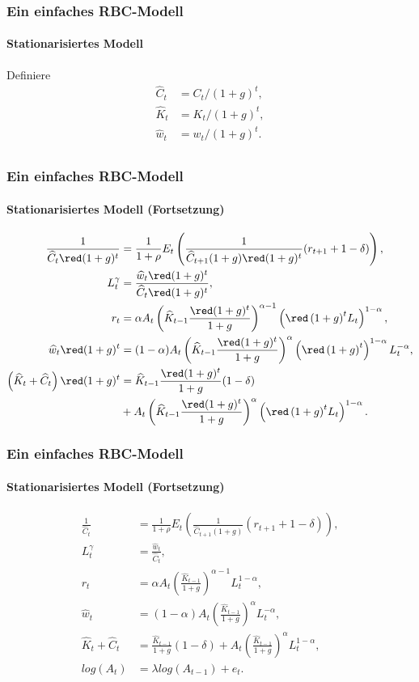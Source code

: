 \documentclass[10pt]{beamer}  %
\begin{document}
\begin{frame}\frametitle{Ein einfaches RBC-Modell}
  \framesubtitle{Stationarisiertes Modell}
  Definiere
  \begin{align*}
    \widehat{C}_t &= C_t/(1+g)^t,\\
    \widehat{K}_t &= K_t/(1+g)^t,\\
    \widehat{w}_t &= w_t/(1+g)^t.\\
  \end{align*}
\end{frame}

\begin{frame}\frametitle{Ein einfaches RBC-Modell}
  \framesubtitle{Stationarisiertes Modell (Fortsetzung)}
  \begin{align*}
    \frac{1}{\widehat{C}_t{\red(1+g)^t}}&=\frac{1}{1+\rho}E_t\left(\frac{1}{\widehat{C}_{t+1}(1+g){\red(1+g)^t}}(r_{t+1}+1-\delta)\right),\\
    L_t^\gamma&=\frac{\widehat{w}_t{\red(1+g)^t}}{\widehat{C}_t{\red(1+g)^t}},\\
    r_t &= \alpha A_t\left(\widehat{K}_{t-1}\frac{\red(1+g)^t}{1+g}\right)^{\alpha-1}\left( {\red\left( 1+g\right) ^{t}}L_t\right)^{1-\alpha},\\
    \widehat{w}_t{\red(1+g)^t} &= (1-\alpha) A_t\left(\widehat{K}_{t-1}\frac{\red(1+g)^t}{1+g}\right)^\alpha\left( {\red\left( 1+g\right) ^{t}}\right)^{1-\alpha}L_t^{-\alpha},\\
    \left(\widehat{K}_t+\widehat{C}_t\right){\red(1+g)^t} &= \widehat{K}_{t-1}\frac{\red(1+g)^t}{1+g}(1-\delta)\\
&+A_t\left(\widehat{K}_{t-1}\frac{\red(1+g)^t}{1+g}\right)^\alpha\left( {\red\left( 1+g\right) ^{t}}L_t\right)^{1-\alpha}.
  \end{align*}

\end{frame}

\begin{frame}\frametitle{Ein einfaches RBC-Modell}
  \framesubtitle{Stationarisiertes Modell (Fortsetzung)}
  \begin{align*}
    \frac{1}{\widehat{C}_t}&=\frac{1}{1+\rho}E_t\left(\frac{1}{\widehat{C}_{t+1}(1+g)}(r_{t+1}+1-\delta)\right),\\
    L_t^\gamma&=\frac{\widehat{w}_t}{\widehat{C}_t},\\
    r_t &= \alpha A_t\left(\frac{\widehat{K}_{t-1}}{1+g}\right)^{\alpha-1}L_t^{1-\alpha},\\
    \widehat{w}_t &= (1-\alpha) A_t\left(\frac{\widehat{K}_{t-1}}{1+g}\right)^\alpha L_t^{-\alpha},\\
    \widehat{K}_t+\widehat{C}_t &= \frac{\widehat{K}_{t-1}}{1+g}(1-\delta)+A_t\left(\frac{\widehat{K}_{t-1}}{1+g}\right)^\alpha L_t^{1-\alpha},\\
    log(A_{t})&=\lambda log(A_{t-1}) + e_{t}.
  \end{align*}
\end{frame}
\end{document}
